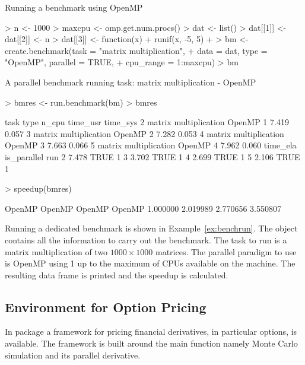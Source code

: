 \begin{Example} Running a benchmark using OpenMP
\label{ex:benchrun}
\begin{Schunk}
\begin{Sinput}
> n <- 1000
> maxcpu <- omp.get.num.procs()
> dat <- list()
> dat[[1]] <- dat[[2]] <- n
> dat[[3]] <- function(x) {
+     runif(x, -5, 5)
+ }
> bm <- create.benchmark(task = "matrix multiplication", 
+     data = dat, type = "OpenMP", parallel = TRUE, 
+     cpu_range = 1:maxcpu)
> bm
\end{Sinput}
\begin{Soutput}
A parallel benchmark running task: matrix multiplication - OpenMP
\end{Soutput}
\begin{Sinput}
> bmres <- run.benchmark(bm)
> bmres
\end{Sinput}
\begin{Soutput}
                   task   type n_cpu time_usr time_sys
2 matrix multiplication OpenMP     1    7.419    0.057
3 matrix multiplication OpenMP     2    7.282    0.053
4 matrix multiplication OpenMP     3    7.663    0.066
5 matrix multiplication OpenMP     4    7.962    0.060
  time_ela is_parallel run
2    7.478        TRUE   1
3    3.702        TRUE   1
4    2.699        TRUE   1
5    2.106        TRUE   1
\end{Soutput}
\begin{Sinput}
> speedup(bmres)
\end{Sinput}
\begin{Soutput}
  OpenMP   OpenMP   OpenMP   OpenMP 
1.000000 2.019989 2.770656 3.550807 
\end{Soutput}
\end{Schunk}
\end{Example}

Running a dedicated benchmark is shown in
Example~\ref{ex:benchrun}. The object  contains all the
information to carry out the benchmark. The task to run is a matrix
multiplication of two $1000 \times 1000$ matrices. The parallel
paradigm to use is OpenMP using 1 up to the maximum of CPUs available
on the machine. The resulting data frame is printed and the speedup is
calculated.

\subsection{Environment for Option Pricing}

In package  a framework for pricing financial derivatives,
in particular options, is available. The framework is built around the
main function namely Monte Carlo simulation and its parallel
derivative. 

